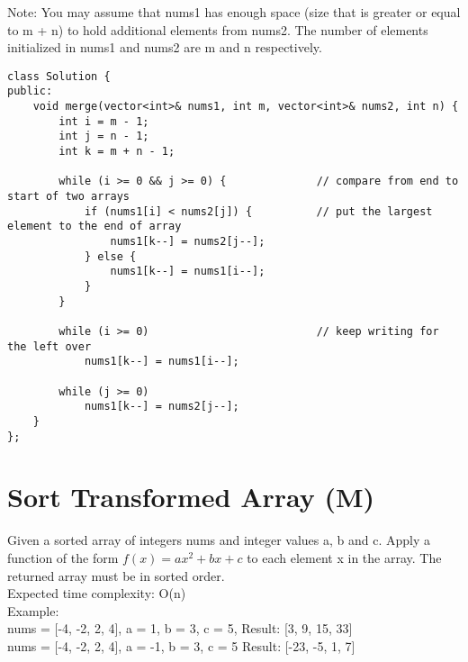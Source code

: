 Note: You may assume that nums1 has enough space (size that is greater or equal to m + n) to hold additional elements from nums2. The number of elements initialized in nums1 and nums2 are m and n respectively.\\

\begin{lstlisting}
class Solution {
public:
    void merge(vector<int>& nums1, int m, vector<int>& nums2, int n) {
        int i = m - 1;
        int j = n - 1;
        int k = m + n - 1;
        
        while (i >= 0 && j >= 0) {              // compare from end to start of two arrays
            if (nums1[i] < nums2[j]) {          // put the largest element to the end of array
                nums1[k--] = nums2[j--];
            } else {
                nums1[k--] = nums1[i--];
            }
        }
        
        while (i >= 0)                          // keep writing for the left over
            nums1[k--] = nums1[i--];
            
        while (j >= 0)
            nums1[k--] = nums2[j--];
    }
};
\end{lstlisting}


\section{Sort Transformed Array (M)}
Given a sorted array of integers nums and integer values a, b and c. Apply a function of the form $f(x) = ax^2 + bx + c$ to each element x in the array. The returned array must be in sorted order.\\

Expected time complexity: O(n)\\

Example:\\
nums = [-4, -2, 2, 4], a = 1, b = 3, c = 5,
Result: [3, 9, 15, 33]\\
nums = [-4, -2, 2, 4], a = -1, b = 3, c = 5
Result: [-23, -5, 1, 7]\\

